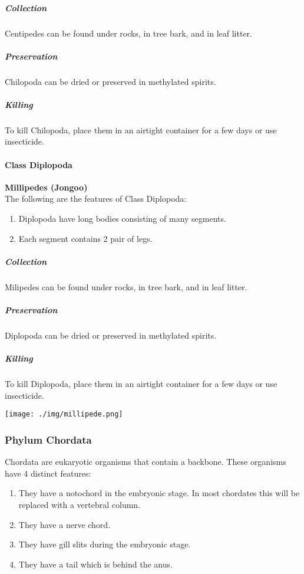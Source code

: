 \begin{multicols}{2}
%

\subparagraph{Collection}
Centipedes can be found under rocks, in tree bark, and in leaf litter.

\subparagraph{Preservation} 
Chilopoda can be dried or preserved in methylated spirits.

\subparagraph{Killing}
To kill Chilopoda, place them in an airtight container for a few days or use insecticide.

\paragraph{Class Diplopoda}
\textbf{Millipedes (Jongoo)}\\
The following are the features of Class Diplopoda:
\begin{enumerate}
\item{Diplopoda have long bodies consisting of many segments.}
\item{Each segment contains 2 pair of legs.}
\end{enumerate}

\subparagraph{Collection}
Milipedes can be found under rocks, in tree bark, and in leaf litter.

\subparagraph{Preservation} 
Diplopoda can be dried or preserved in methylated spirits.

\subparagraph{Killing}
To kill Diplopoda, place them in an airtight container for a few days or use insecticide.
		
\begin{center}
\texttt{[image: ./img/millipede.png]}
\end{center}

%


\subsubsection{Phylum Chordata}
Chordata are eukaryotic organisms that contain a backbone. These organisms have 4 distinct features:
\begin{enumerate}
\item{They have a notochord in the embryonic stage. In most chordates this will be replaced with a vertebral column.}
\item{They have a nerve chord.}
\item{They have gill slits during the embryonic stage.}
\item{They have a tail which is behind the anus.}
\end{enumerate}


\end{multicols}
